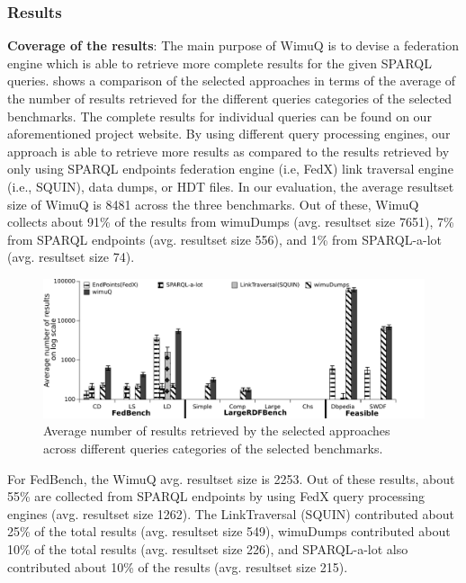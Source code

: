 \documentclass[sw]{iosart2x}
\begin{document}
\subsubsection{Results}
\textbf{Coverage of the results}: The main purpose of WimuQ is to devise a federation engine which is able to retrieve more complete results for the given SPARQL queries. %
 shows a comparison of the selected approaches in terms of the average of the number of results retrieved for the different queries categories of the selected benchmarks. The complete results for individual queries can be found on our aforementioned project website. By using different query processing engines, our approach is able to retrieve more results as compared to the results retrieved by only using SPARQL endpoints federation engine (i.e, FedX) link traversal engine (i.e., SQUIN), data dumps, or  HDT files. In our evaluation, the average resultset size of WimuQ is \num{8481} across the three benchmarks. Out of these, WimuQ collects about 91\% of the results from wimuDumps (avg. resultset size 7651), 7\% from SPARQL endpoints (avg. resultset size 556), and 1\% from SPARQL-a-lot (avg. resultset size 74). 

\begin{figure}[htb]
    \includegraphics[width=\textwidth]{img/numberRes1.pdf}
	\caption{Average number of results retrieved by the selected approaches across different queries categories of the selected benchmarks.}
	\label{fig:numberRes1}
\end{figure}

For FedBench, the WimuQ avg. resultset size is \num{2253}. Out of these results, about 55\% are collected from SPARQL endpoints by using FedX query processing engines (avg. resultset size \num{1262}). The LinkTraversal (SQUIN) contributed about 25\% of the total results (avg. resultset size 549), wimuDumps contributed about 10\% of the total results (avg. resultset size 226), and SPARQL-a-lot also contributed about 10\% of the results (avg. resultset size 215). 
\end{document}
